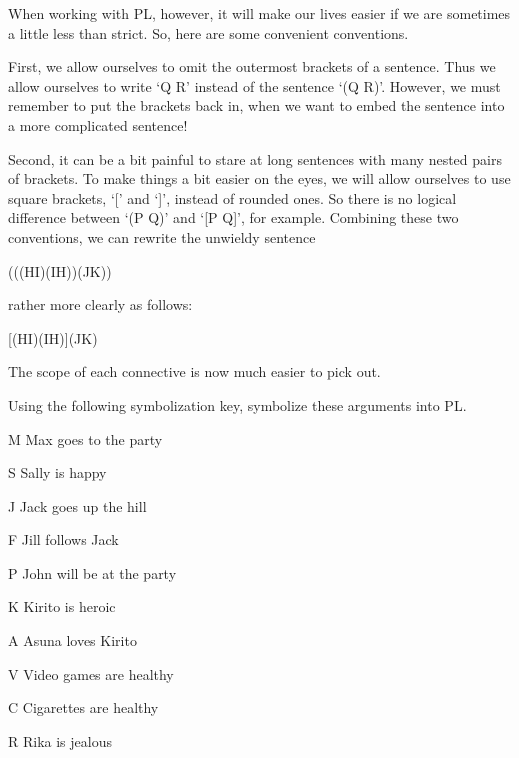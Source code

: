 When working with PL, however, it will make our lives easier if we are sometimes a little less than strict. So, here are some convenient conventions.

First, we allow ourselves to omit the outermost brackets of a sentence. Thus we allow ourselves to write ‘Q \eand  R’ instead of the sentence ‘(Q \eand  R)’. However, we must remember to put the brackets back in, when we want to embed the sentence into a more complicated sentence!

Second, it can be a bit painful to stare at long sentences with many nested pairs of brackets. To make things a bit easier on the eyes, we will allow ourselves to use square brackets, ‘[’ and ‘]’, instead of rounded ones. So there is no logical difference between ‘(P \eor  Q)’ and ‘[P \eor  Q]’, for example.
Combining these two conventions, we can rewrite the unwieldy sentence
\begin{center}(((H\eif I)\eor (I\eif H))\eand (J\eor K))\end{center}
rather more clearly as follows:
\begin{center}[(H\eif I)\eor (I\eif H)]\eand (J\eor K)\end{center} 
The scope of each connective is now much easier to pick out.

\practiceproblems
\problempart
\label{pr.morecomplexsymbol}
Using the following symbolization key, symbolize these arguments into PL.
	\begin{ekey}
		\item[M] Max goes to the party
		\item[S] Sally is happy
		\item[J] Jack goes up the hill
		\item[F] Jill follows Jack
		\item[P] John will be at the party
		\item[K] Kirito is heroic
		\item[A] Asuna loves Kirito
		\item[V] Video games are healthy
		\item[C] Cigarettes are healthy
		\item[R] Rika is jealous
	\end{ekey}

